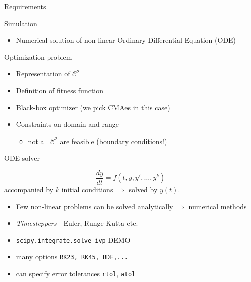 \documentclass[presentation]{beamer}
\begin{document}
\begin{frame}[label={sec:org22ba841}]{Requirements}
\begin{alertblock}{Simulation}
\begin{itemize}
\item \alert{Numerical solution} of non-linear Ordinary Differential Equation (ODE)
\end{itemize}
\end{alertblock}
\begin{alertblock}{Optimization problem}
\begin{itemize}
\item \alert{Representation} of \(\mathcal{C}^2\)
\item Definition of \alert{fitness function}
\item Black-box \alert{optimizer} (we pick CMAes in this case)
\item \alert{Constraints} on domain and range
\begin{itemize}
\item not all \(\mathcal{C}^2\) are feasible (boundary conditions!)
\end{itemize}
\end{itemize}
\end{alertblock}
\end{frame}
\begin{frame}[label={sec:org13c8a1e},fragile]{ODE solver}
 \begin{definition}
\[ \frac{dy}{dt} = f(t, y, y', \dots, y^{k})\]
accompanied by \(k\) initial conditions \(\Rightarrow\) solved by \(y(t)\).
\begin{itemize}
\item Few non-linear problems can be solved analytically \(\Rightarrow\) \alert{numerical methods}
\item \emph{Timesteppers}---Euler, Runge-Kutta etc.
\end{itemize}
\end{definition}
\begin{example}
\begin{itemize}
\item \texttt{scipy.integrate.solve\_ivp} \alert{DEMO}
\item many options \texttt{RK23, RK45, BDF,...}
\item can specify error tolerances \texttt{rtol}, \texttt{atol}
\end{itemize}
\end{example}
\end{frame}
\end{document}
